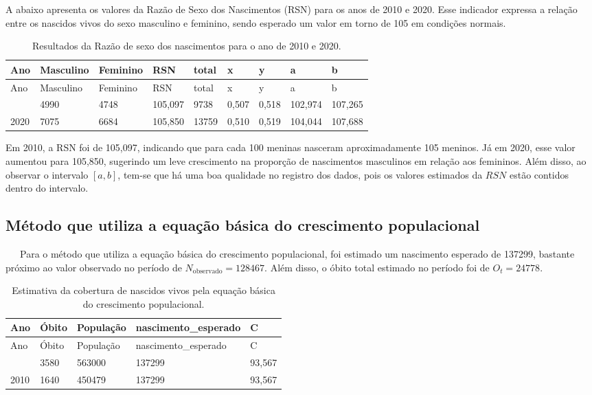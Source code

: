 \documentclass[
  12pt,
  a4paper,
]{scrreprt}
\begin{document}
A abaixo apresenta os valores da Razão de Sexo dos Nascimentos (RSN)
para os anos de 2010 e 2020. Esse indicador expressa a relação entre os
nascidos vivos do sexo masculino e feminino, sendo esperado um valor em
torno de 105 em condições normais.

\begin{longtable}[]{@{}lllllllll@{}}
\caption{Resultados da Razão de sexo dos nascimentos para o ano de 2010
e 2020.}\label{T_cc35a}\tabularnewline
\toprule\noalign{}
Ano & Masculino & Feminino & RSN & total & x & y & a & b \\
\midrule\noalign{}
\endfirsthead
\toprule\noalign{}
Ano & Masculino & Feminino & RSN & total & x & y & a & b \\
\midrule\noalign{}
\endhead
\bottomrule\noalign{}
\endlastfoot
2010 & 4990 & 4748 & 105,097 & 9738 & 0,507 & 0,518 & 102,974 &
107,265 \\
2020 & 7075 & 6684 & 105,850 & 13759 & 0,510 & 0,519 & 104,044 &
107,688 \\
\end{longtable}

Em 2010, a RSN foi de 105,097, indicando que para cada 100 meninas
nasceram aproximadamente 105 meninos. Já em 2020, esse valor aumentou
para 105,850, sugerindo um leve crescimento na proporção de nascimentos
masculinos em relação aos femininos. Além disso, ao observar o intervalo
\(\left[a, b\right]\), tem-se que há uma boa qualidade no registro dos
dados, pois os valores estimados da \(RSN\) estão contidos dentro do
intervalo.

\subsection{Método que utiliza a equação básica do crescimento
populacional}\label{muxe9todo-que-utiliza-a-equauxe7uxe3o-buxe1sica-do-crescimento-populacional-1}

~~~Para o método que utiliza a equação básica do crescimento
populacional, foi estimado um nascimento esperado de 137299, bastante
próximo ao valor observado no período de
\(N_{\text{observado}} = 128467\). Além disso, o óbito total estimado no
período foi de \(O_t = 24778\).

\begin{longtable}[]{@{}lllll@{}}
\caption{Estimativa da cobertura de nascidos vivos pela equação básica
do crescimento populacional.}\label{T_0cc95}\tabularnewline
\toprule\noalign{}
Ano & Óbito & População & nascimento\_esperado & C \\
\midrule\noalign{}
\endfirsthead
\toprule\noalign{}
Ano & Óbito & População & nascimento\_esperado & C \\
\midrule\noalign{}
\endhead
\bottomrule\noalign{}
\endlastfoot
2020 & 3580 & 563000 & 137299 & 93,567 \\
2010 & 1640 & 450479 & 137299 & 93,567 \\
\end{longtable}
\end{document}

